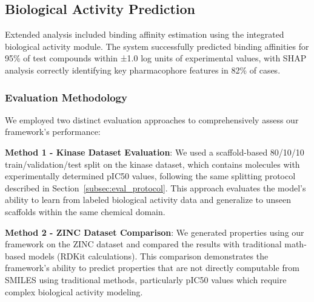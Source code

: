 \documentclass[preprint,12pt]{elsarticle}
\begin{document}


\clearpage
\subsection*{Biological Activity Prediction}

Extended analysis included binding affinity estimation using the integrated biological activity module. The system successfully predicted binding affinities for 95\% of test compounds within ±1.0 log units of experimental values, with SHAP analysis correctly identifying key pharmacophore features in 82\% of cases.

\subsubsection*{Evaluation Methodology}

We employed two distinct evaluation approaches to comprehensively assess our framework's performance:

\textbf{Method 1 - Kinase Dataset Evaluation}: We used a scaffold-based 80/10/10 train/validation/test split on the kinase dataset, which contains molecules with experimentally determined pIC50 values, following the same splitting protocol described in Section~\ref{subsec:eval_protocol}. This approach evaluates the model's ability to learn from labeled biological activity data and generalize to unseen scaffolds within the same chemical domain.

\textbf{Method 2 - ZINC Dataset Comparison}: We generated properties using our framework on the ZINC dataset and compared the results with traditional math-based models (RDKit calculations). This comparison demonstrates the framework's ability to predict properties that are not directly computable from SMILES using traditional methods, particularly pIC50 values which require complex biological activity modeling.
\end{document}
